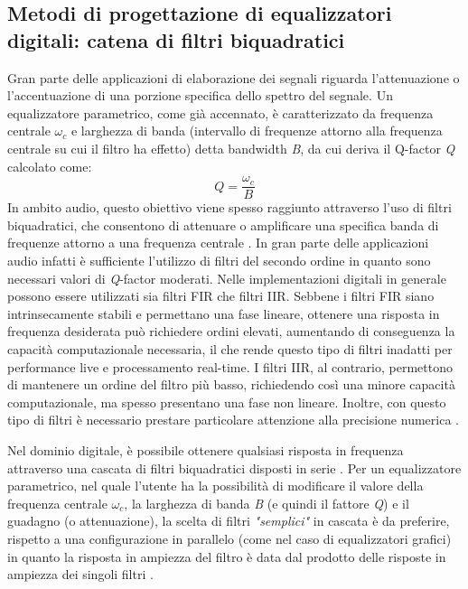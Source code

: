 \documentclass[12pt]{report}
\begin{document}
\subsection{Metodi di progettazione di equalizzatori digitali: catena di filtri biquadratici}
Gran parte delle applicazioni di elaborazione dei segnali riguarda l'attenuazione o l'accentuazione di una porzione specifica dello spettro del segnale.
Un equalizzatore parametrico, come già accennato, è caratterizzato da frequenza centrale \(\omega_c\) e larghezza di banda (intervallo di frequenze attorno alla frequenza centrale su cui il filtro ha effetto) detta bandwidth \textit{B}, da cui deriva il Q-factor \textit{Q} calcolato come:
\begin{equation}
    \textit{Q}=\frac{\omega_c}{\textit{B}}
\end{equation}
In ambito audio, questo obiettivo viene spesso raggiunto attraverso l’uso di filtri biquadratici, che consentono di attenuare o amplificare una specifica banda di frequenze attorno a una frequenza centrale \parencite{reiss2010design}.
In gran parte delle applicazioni audio infatti è sufficiente l'utilizzo di filtri del secondo ordine in quanto sono necessari valori di \textit{Q}-factor moderati. Nelle implementazioni digitali in generale possono essere utilizzati sia filtri FIR che filtri IIR. Sebbene i filtri FIR siano intrinsecamente stabili e permettano una fase lineare, ottenere una risposta in frequenza desiderata può richiedere ordini elevati, aumentando di conseguenza la capacità computazionale necessaria, il che rende questo tipo di filtri inadatti per performance live e processamento real-time.
I filtri IIR, al contrario, permettono di mantenere un ordine del filtro più basso, richiedendo così una minore capacità computazionale, ma spesso presentano una fase non lineare. Inoltre, con questo tipo di filtri è necessario prestare particolare attenzione alla precisione numerica \parencite{shpak1991analytical}.

Nel dominio digitale, è possibile ottenere qualsiasi risposta in frequenza attraverso una cascata di filtri biquadratici disposti in serie \parencite{reiss2010design}. Per un equalizzatore parametrico, nel quale l'utente ha la possibilità di modificare il valore della frequenza centrale \(\omega_c\), la larghezza di banda \textit{B} (e quindi il fattore \textit{Q}) e il guadagno (o attenuazione), la scelta di filtri \textit{"semplici"} in cascata è da preferire, rispetto a una configurazione in parallelo (come nel caso di equalizzatori grafici) in quanto la risposta in ampiezza del filtro è data dal prodotto delle risposte in ampiezza dei singoli filtri \parencite{shpak1991analytical}.
\end{document}
